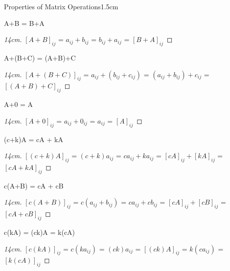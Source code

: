     \vspace{0.5cm}



    \begin{ltheorem}{Properties of Matrix Operations}{1.5cm}
        \item A+B = B+A
        
            \begin{proof}[14cm]
                $[A+B]_{ij}$ = $a_{ij} + b_{ij}$
                = $b_{ij} + a_{ij}$ = $[B+A]_{ij}$
            \end{proof}
        
        \item A+(B+C) = (A+B)+C
        
            \begin{proof}[14cm]
                $[A+(B+C)]_{ij}$ = $a_{ij} + (b_{ij} + c_{ij})$
                = $(a_{ij} + b_{ij}) + c_{ij}$ = $[(A+B)+C]_{ij}$
            \end{proof}
        
        \item A+0 = A
        
            \begin{proof}[14cm]
                $[A+0]_{ij}$ = $a_{ij} + 0_{ij}$
                = $a_{ij}$ = $[A]_{ij}$
            \end{proof}
        
        \item (c+k)A = cA + kA
            
            \begin{proof}[14cm]
                $[(c+k)A]_{ij}$ = $(c+k)a_{ij}$
                = $ca_{ij} + ka_{ij}$ = $[cA]_{ij} + [kA]_{ij}$
                = $[cA + kA]_{ij}$
            \end{proof}
        
        \item c(A+B) = cA + cB
        
            \begin{proof}[14cm]
                $[c(A+B)]_{ij}$ = $c(a_{ij} + b_{ij})$
                = $ca_{ij} + cb_{ij}$ = $[cA]_{ij} + [cB]_{ij}$
                = $[cA+cB]_{ij}$
            \end{proof}

        \item c(kA) = (ck)A = k(cA)
        
            \begin{proof}[14cm]
                $[c(kA)]_{ij}$
                = $c(ka_{ij})$
                = $(ck)a_{ij}$
                = $[(ck)A]_{ij}$
                = $k(ca_{ij})$
                = $[k(cA)]_{ij}$
            \end{proof}


\end{ltheorem}
